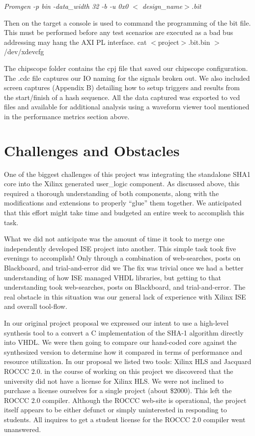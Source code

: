 \documentclass[journal]{IEEEtran}
\begin{document}
\emph{Promgen -p bin -data\_width 32 -b -u 0x0 $<$ design\_name$>$.bit}

Then on the target a console is used to command the programming of the bit file.  This must be performed before any test scenarios are executed as a bad bus addressing may hang the AXI PL interface.
cat $<$project$>$.bit.bin $>$ /dev/xdevcfg

The chipscope folder contains the cpj file that saved our chipscope configuration.  The .cdc file captures our IO naming for the signals broken out.  We also included screen captures (Appendix B) detailing how to setup triggers and results from the start/finish of a hash sequence.  All the data captured was exported to vcd files and available for additional analysis using a waveform viewer tool mentioned in the performance metrics section above.

\section{Challenges and Obstacles}
One of the biggest challenges of this project was integrating the standalone SHA1 core into the Xilinx generated user\_logic component.  As discussed above, this required a thorough understanding of both components, along with the modifications and extensions to properly “glue” them together.  We anticipated that this effort might take time and budgeted an entire week to accomplish this task.

What we did not anticipate was the amount of time it took to merge one independently developed ISE project into another.  This simple task took five evenings to accomplish!  Only  through a combination of web-searches, posts on Blackboard, and trial-and-error did we   The fix was trivial once we had a better understanding of how ISE managed VHDL libraries, but getting to that understanding took web-searches, posts on Blackboard, and trial-and-error.  The real obstacle in this situation was our general lack of experience with Xilinx ISE and overall tool-flow.

In our original project proposal we expressed our intent to use a high-level synthesis tool to a convert a C implementation of the SHA-1 algorithm directly into VHDL.  We were then going to compare our hand-coded core against the synthesized version to determine how it compared in terms of performance and resource utilization.  In our proposal we listed two tools:  Xilinx HLS and Jacquard ROCCC 2.0.  in the course of working on this project we discovered that the university did not have a license for Xilinx HLS.  We were not inclined to purchase a license ourselves for a single project (about \$2000).  This left the ROCCC 2.0 compiler.  Although the ROCCC web-site is operational, the project itself appears to be either defunct or simply uninterested in responding to students.  All inquires to get a student license for the ROCCC 2.0 compiler went unanswered.
\end{document}
